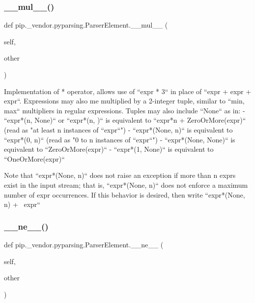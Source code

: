 \subsubsection{\texorpdfstring{\+\_\+\+\_\+mul\+\_\+\+\_\+()}{\_\_mul\_\_()}}
{\footnotesize\ttfamily def pip.\+\_\+vendor.\+pyparsing.\+Parser\+Element.\+\_\+\+\_\+mul\+\_\+\+\_\+ (\begin{DoxyParamCaption}\item[{}]{self,  }\item[{}]{other }\end{DoxyParamCaption})}

\begin{DoxyVerb}Implementation of * operator, allows use of ``expr * 3`` in place of
``expr + expr + expr``.  Expressions may also me multiplied by a 2-integer
tuple, similar to ``{min, max}`` multipliers in regular expressions.  Tuples
may also include ``None`` as in:
 - ``expr*(n, None)`` or ``expr*(n, )`` is equivalent
      to ``expr*n + ZeroOrMore(expr)``
      (read as "at least n instances of ``expr``")
 - ``expr*(None, n)`` is equivalent to ``expr*(0, n)``
      (read as "0 to n instances of ``expr``")
 - ``expr*(None, None)`` is equivalent to ``ZeroOrMore(expr)``
 - ``expr*(1, None)`` is equivalent to ``OneOrMore(expr)``

Note that ``expr*(None, n)`` does not raise an exception if
more than n exprs exist in the input stream; that is,
``expr*(None, n)`` does not enforce a maximum number of expr
occurrences.  If this behavior is desired, then write
``expr*(None, n) + ~expr``
\end{DoxyVerb}
 \mbox{\label{classpip_1_1__vendor_1_1pyparsing_1_1ParserElement_a87fa6a51d15e072f3cc3195de82456d8}} 
\subsubsection{\texorpdfstring{\+\_\+\+\_\+ne\+\_\+\+\_\+()}{\_\_ne\_\_()}}
{\footnotesize\ttfamily def pip.\+\_\+vendor.\+pyparsing.\+Parser\+Element.\+\_\+\+\_\+ne\+\_\+\+\_\+ (\begin{DoxyParamCaption}\item[{}]{self,  }\item[{}]{other }\end{DoxyParamCaption})}

